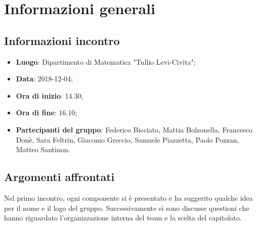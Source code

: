 \section{Informazioni generali}

\subsection{Informazioni incontro}
\begin{itemize}
\item \textbf{Luogo}: Dipartimento di Matematica "Tullio Levi-Civita";
\item \textbf{Data}: 2018-12-04;
\item \textbf{Ora di inizio}: 14.30;
\item \textbf{Ora di fine}: 16.10;
\item \textbf{Partecipanti del gruppo}: Federico Bicciato, Mattia Bolzonella, 
Francesco Donè, Sara Feltrin, Giacomo Greccio, Samuele Piazzetta, Paolo Pozzan, 
Matteo Santinon. 
\end{itemize}

\subsection{Argomenti affrontati}
Nel primo incontro, ogni componente si è presentato e ha suggerito qualche idea 
per il nome e il logo del gruppo. Successivamente si sono discusse questioni 
che hanno riguardato l'organizzazione interna del team e la scelta del capitolato.

